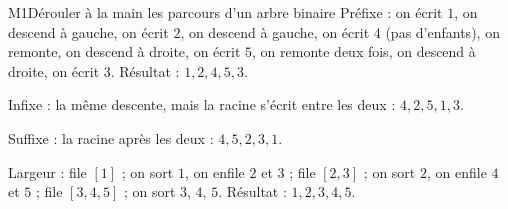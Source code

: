 \begin{fichemethode}{M1}{Dérouler à la main les parcours d'un arbre binaire}
Préfixe : on écrit $1$, on descend à gauche, on écrit $2$, on descend à gauche, on écrit $4$
(pas d'enfants), on remonte, on descend à droite, on écrit $5$, on remonte deux fois, on
descend à droite, on écrit $3$. Résultat : $1, 2, 4, 5, 3$.

Infixe : la même descente, mais la racine s'écrit entre les deux : $4, 2, 5, 1, 3$.

Suffixe : la racine après les deux : $4, 5, 2, 3, 1$.

Largeur : file $[1]$ ; on sort $1$, on enfile $2$ et $3$ ; file $[2, 3]$ ; on sort $2$, on
enfile $4$ et $5$ ; file $[3, 4, 5]$ ; on sort $3$, $4$, $5$. Résultat : $1, 2, 3, 4, 5$.

%
%
%
%
%
%
%


\end{fichemethode}
